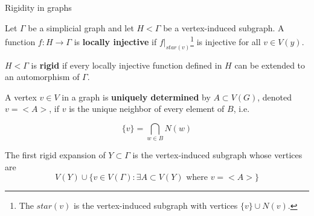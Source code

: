 \documentclass[handout]{beamer}
\theoremstyle{plain}
\begin{document}
\begin{frame}{Rigidity in graphs}
    \begin{definition}
Let $\Gamma$ be a simplicial graph and let $H<\Gamma$ be a vertex-induced subgraph. A function $f:H\to \Gamma$ is \textbf{locally injective} if $f|_{star(v)}$\footnote{The $star(v)$ is the vertex-induced subgraph with vertices $\{ v \} \cup N(v)$.} is injective for all $v \in V(y)$. 
\end{definition}

\begin{definition}
$H<\Gamma$ is \textbf{rigid} if every locally injective function defined in $H$ can be extended to an automorphism of $\Gamma$. 
\end{definition}
\end{frame}

\begin{frame}
A vertex $v \in V$ in a graph is \textbf{uniquely determined} by $A\subset V(G)$, denoted $v=<A>$, if $v$ is the unique neighbor of every element of $B$, i.e.

$$ \{ v \} = \bigcap_{w\in B} N(w) $$

\begin{definition}
The first rigid expansion of $Y\subset \Gamma$ is the vertex-induced subgraph whose vertices are
$$ V(Y) \cup \{ v\in V(\Gamma) :  \exists A \subset V(Y) \text{ where } v = <A>  \}$$
\end{definition}

\end{frame}



\end{document}
